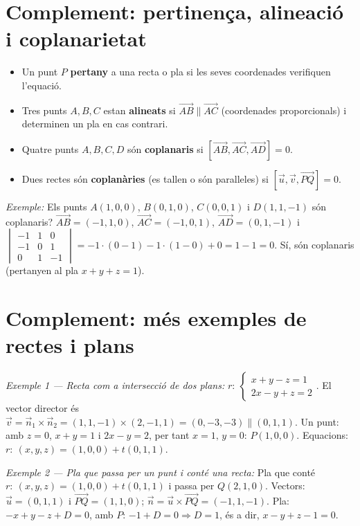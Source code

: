 \section{Complement: pertinença, alineació i coplanarietat}

\begin{itemize}
\item Un punt $P$ \textbf{pertany} a una recta o pla si les seves coordenades verifiquen l'equació.
\item Tres punts $A,B,C$ estan \textbf{alineats} si $\overrightarrow{AB}\parallel\overrightarrow{AC}$ (coordenades proporcionals) i determinen un pla en cas contrari.
\item Quatre punts $A,B,C,D$ són \textbf{coplanaris} si $[\overrightarrow{AB},\overrightarrow{AC},\overrightarrow{AD}]=0$.
\item Dues rectes són \textbf{coplanàries} (es tallen o són paral\textperiodcentered{}leles) si $[\vec u,\vec v,\overrightarrow{PQ}]=0$.
\end{itemize}

\emph{Exemple:} Els punts $A(1,0,0)$, $B(0,1,0)$, $C(0,0,1)$ i $D(1,1,-1)$ són coplanaris? $\overrightarrow{AB}=(-1,1,0)$, $\overrightarrow{AC}=(-1,0,1)$, $\overrightarrow{AD}=(0,1,-1)$ i $\begin{vmatrix}-1&1&0\\-1&0&1\\0&1&-1\end{vmatrix}=-1\cdot(0-1)-1\cdot(1-0)+0=1-1=0$. Sí, són coplanaris (pertanyen al pla $x+y+z=1$).

\section{Complement: més exemples de rectes i plans}

\emph{Exemple 1 --- Recta com a intersecció de dos plans:} $r:\ \begin{cases}x+y-z=1\\2x-y+z=2\end{cases}$. El vector director és $\vec v=\vec n_1\times\vec n_2=(1,1,-1)\times(2,-1,1)=(0,-3,-3)\parallel(0,1,1)$. Un punt: amb $z=0$, $x+y=1$ i $2x-y=2$, per tant $x=1,\,y=0$: $P(1,0,0)$. Equacions: $r:\ (x,y,z)=(1,0,0)+t(0,1,1)$.

\emph{Exemple 2 --- Pla que passa per un punt i conté una recta:} Pla que conté $r:\ (x,y,z)=(1,0,0)+t(0,1,1)$ i passa per $Q(2,1,0)$. Vectors: $\vec u=(0,1,1)$ i $\overrightarrow{PQ}=(1,1,0)$; $\vec n=\vec u\times\overrightarrow{PQ}=(-1,1,-1)$. Pla: $-x+y-z+D=0$, amb $P$: $-1+D=0\Rightarrow D=1$, és a dir, $x-y+z-1=0$.
